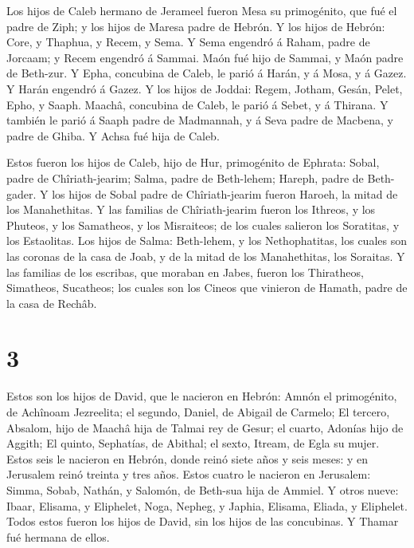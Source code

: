  Los hijos de Caleb hermano de Jerameel fueron Mesa su
primogénito, que fué el padre de Ziph; y los hijos de Maresa padre de
Hebrón.  Y los hijos de Hebrón: Core, y Thaphua, y Recem, y
Sema.  Y Sema engendró á Raham, padre de Jorcaam; y Recem
engendró á Sammai.  Maón fué hijo de Sammai, y Maón padre
de Beth-zur.  Y Epha, concubina de Caleb, le parió á Harán,
y á Mosa, y á Gazez. Y Harán engendró á Gazez.  Y los hijos
de Joddai: Regem, Jotham, Gesán, Pelet, Epho, y Saaph. 
Maachâ, concubina de Caleb, le parió á Sebet, y á Thirana. 
Y también le parió á Saaph padre de Madmannah, y á Seva padre de
Macbena, y padre de Ghiba. Y Achsa fué hija de Caleb.

 Estos fueron los hijos de Caleb, hijo de Hur, primogénito
de Ephrata: Sobal, padre de Chîriath-jearim;  Salma, padre
de Beth-lehem; Hareph, padre de Beth-gader.  Y los hijos de
Sobal padre de Chîriath-jearim fueron Haroeh, la mitad de los
Manahethitas.  Y las familias de Chîriath-jearim fueron los
Ithreos, y los Phuteos, y los Samatheos, y los Misraiteos; de los cuales
salieron los Soratitas, y los Estaolitas.  Los hijos de
Salma: Beth-lehem, y los Nethophatitas, los cuales son las coronas de la
casa de Joab, y de la mitad de los Manahethitas, los Soraitas.
 Y las familias de los escribas, que moraban en Jabes,
fueron los Thiratheos, Simatheos, Sucatheos; los cuales son los Cineos
que vinieron de Hamath, padre de la casa de Rechâb.

\hypertarget{section-2}{%
\section{3}\label{section-2}}

 Estos son los hijos de David, que le nacieron en Hebrón:
Amnón el primogénito, de Achînoam Jezreelita; el segundo, Daniel, de
Abigail de Carmelo;  El tercero, Absalom, hijo de Maachâ
hija de Talmai rey de Gesur; el cuarto, Adonías hijo de Aggith;
 El quinto, Sephatías, de Abithal; el sexto, Itream, de Egla
su mujer.  Estos seis le nacieron en Hebrón, donde reinó
siete años y seis meses: y en Jerusalem reinó treinta y tres años.
 Estos cuatro le nacieron en Jerusalem: Simma, Sobab,
Nathán, y Salomón, de Beth-sua hija de Ammiel.  Y otros
nueve: Ibaar, Elisama, y Eliphelet,  Noga, Nepheg, y Japhia,
 Elisama, Eliada, y Eliphelet.  Todos estos
fueron los hijos de David, sin los hijos de las concubinas. Y Thamar fué
hermana de ellos.

